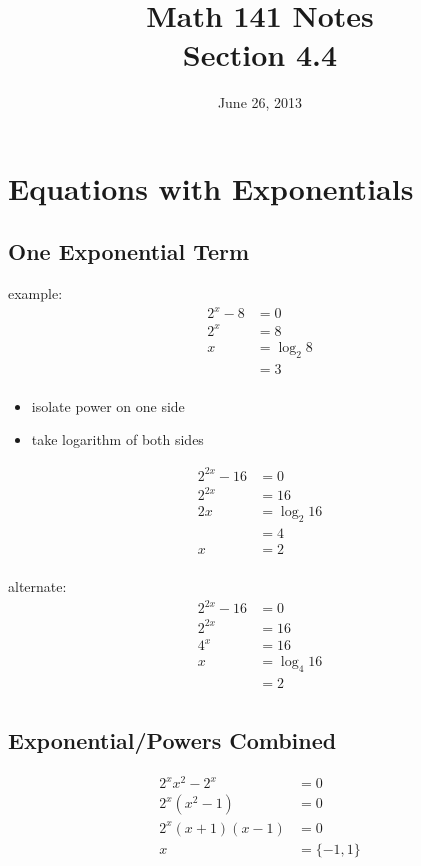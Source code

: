 \documentclass{exam}
\title{Math 141 Notes \\ Section 4.4}
\date{June 26, 2013}
\begin{document}
  \maketitle
  \tableofcontents

  \section{Equations with Exponentials}

  \subsection{One Exponential Term}
  example:
  \begin{align*}
    2^x - 8 &= 0 \\
    2^x     &= 8 \\
    x       &= \log_2 8 \\
            &= 3 \\
  \end{align*}

  \begin{itemize}
    \item isolate power on one side
    \item take logarithm of both sides 
  \end{itemize}

  \begin{align*}
    2^{2x} - 16 &= 0 \\
    2^{2x}      &= 16 \\
    2x          &= \log_2 16 \\
                &= 4 \\
    x           &= 2 \\
  \end{align*}

  alternate:
  \begin{align*}
    2^{2x} - 16 &= 0 \\
    2^{2x} &= 16 \\
    4^x &= 16 \\
    x       &= \log_4 16 \\
            &= 2 \\
  \end{align*}

  \subsection{Exponential/Powers Combined}
  \begin{align*}
    2^x x^2 - 2^x &= 0 \\
    2^x \left( x^2 - 1 \right) &= 0 \\
    2^x (x + 1)(x - 1) &= 0 \\
    x &= \{ -1, 1 \}
  \end{align*}
\end{document}
